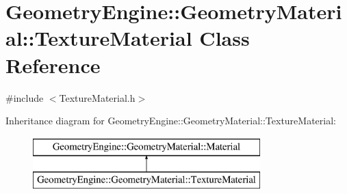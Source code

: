 \hypertarget{class_geometry_engine_1_1_geometry_material_1_1_texture_material}{}\section{Geometry\+Engine\+::Geometry\+Material\+::Texture\+Material Class Reference}
\label{class_geometry_engine_1_1_geometry_material_1_1_texture_material}


{\ttfamily \#include $<$Texture\+Material.\+h$>$}

Inheritance diagram for Geometry\+Engine\+::Geometry\+Material\+::Texture\+Material\+:\begin{figure}[H]
\begin{center}
\leavevmode
\includegraphics[height=2.000000cm]{class_geometry_engine_1_1_geometry_material_1_1_texture_material}
\end{center}
\end{figure}
